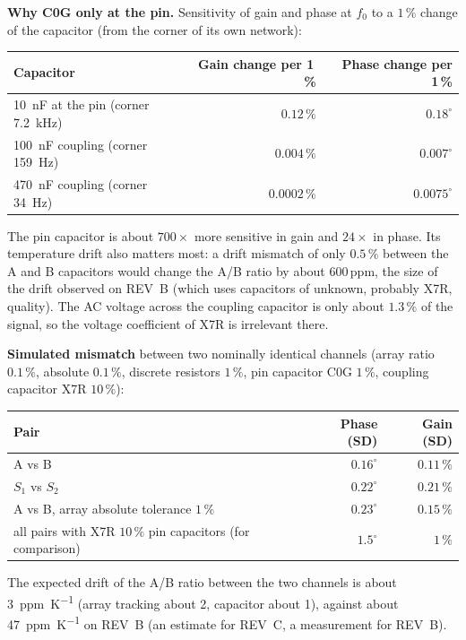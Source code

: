 \documentclass[11pt,a4paper]{article}
\begin{document}
\textbf{Why C0G only at the pin.}  Sensitivity of gain and phase at $f_0$ to a
$1\,\%$ change of the capacitor (from the corner of its own network):
\begin{center}
\small
\begin{tabular}{@{}lrr@{}}
\toprule
Capacitor & Gain change per 1\,\% & Phase change per 1\,\% \\
\midrule
\SI{10}{\nano\farad} at the pin (corner \SI{7.2}{\kilo\hertz}) & $0.12\,\%$ & $0.18^{\circ}$ \\
\SI{100}{\nano\farad} coupling (corner \SI{159}{\hertz}) & $0.004\,\%$ & $0.007^{\circ}$ \\
\SI{470}{\nano\farad} coupling (corner \SI{34}{\hertz}) & $0.0002\,\%$ & $0.0075^{\circ}$ \\
\bottomrule
\end{tabular}
\end{center}
The pin capacitor is about $700\times$ more sensitive in gain and $24\times$ in phase.
Its temperature drift also matters most: a drift mismatch of only $0.5\,\%$ between the A and B
capacitors would change the A/B ratio by about $600$\,ppm, the size of the drift observed on
REV~B (which uses capacitors of unknown, probably X7R, quality).  The AC voltage across the
coupling capacitor is only about $1.3\,\%$ of the signal, so the voltage coefficient of X7R
is irrelevant there.

\textbf{Simulated mismatch} between two nominally identical channels (array ratio $0.1\,\%$,
absolute $0.1\,\%$, discrete resistors $1\,\%$, pin capacitor C0G $1\,\%$, coupling capacitor
X7R $10\,\%$):
\begin{center}
\small
\begin{tabular}{@{}lrr@{}}
\toprule
Pair & Phase (SD) & Gain (SD) \\
\midrule
A vs B & $0.16^{\circ}$ & $0.11\,\%$ \\
$S_1$ vs $S_2$ & $0.22^{\circ}$ & $0.21\,\%$ \\
A vs B, array absolute tolerance $1\,\%$ & $0.23^{\circ}$ & $0.15\,\%$ \\
all pairs with X7R $10\,\%$ pin capacitors (for comparison) & $1.5^{\circ}$ & $1\,\%$ \\
\bottomrule
\end{tabular}
\end{center}
The expected drift of the A/B ratio between the two channels is about \SI{3}{ppm\per\kelvin}
(array tracking about 2, capacitor about 1), against about \SI{47}{ppm\per\kelvin} on REV~B
(an estimate for REV~C, a measurement for REV~B).
\end{document}
